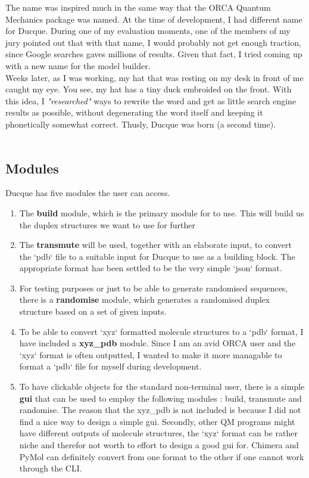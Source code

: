 \noindent The name was inspired much in the same way that the ORCA Quantum Mechanics package\cite{Neese2020Orca, Neese2022ORCA} was named.
At the time of development, I had different name for Ducque. During one of my evaluation moments, one of the members of my jury pointed out that with that name,
I would probably not get enough traction, since Google searches gaves millions of results. Given that fact, I tried coming up with a new name for the model builder.\\
Weeks later, as I was working, my hat that was resting on my desk in front of me caught my eye. You see, my hat has a tiny duck embroided on the front. With this idea, I \textit{"researched"} ways to rewrite the word and get as little search engine results as possible, without degenerating the word itself and keeping it phonetically somewhat correct. Thusly, Ducque was born (a second time).\\
\\
\subsection{Modules}
Ducque has five modules the user can access.
\begin{enumerate}[leftmargin=*]
    \setlength\itemsep{-1.5mm}
    \item The \textbf{build} module, which is the primary module for to use. This will build us the duplex structures we want to use for further 
    \item The \textbf{transmute} will be used, together with an elaborate input, to convert the `pdb` file to a suitable input for Ducque to use as a building block.
        The appropriate format has been settled to be the very simple `json` format.
    \item For testing purposes or just to be able to generate randomised sequences, there is a \textbf{randomise} module, which generates a randomised duplex structure based on a set of given inputs.
    \item To be able to convert `xyz` formatted molecule structures to a `pdb` format, I have included a \textbf{xyz\_pdb} module. Since I am an avid ORCA user and the `xyz` format is often outputted, I wanted to make it more managable to format a `pdb` file for myself during development.
    \item To have clickable objects for the standard non-terminal user, there is a simple \textbf{gui} that can be used to employ the following modules : build, transmute and randomise. The reason that the xyz\_pdb is not included is because I did not find a nice way to design a simple gui. Secondly, other QM programs might have different outputs of molecule structures, the `xyz` format can be rather niche and therefor not worth to effort to design a good gui for. Chimera and PyMol can definitely convert from one format to the other if one cannot work through the CLI.
\end{enumerate}
